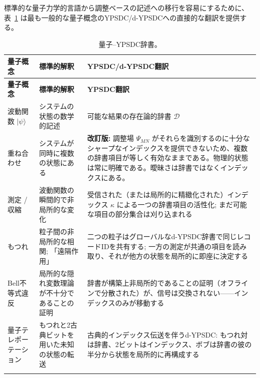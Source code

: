 \documentclass[12pt,a4paper]{article}
\theoremstyle{definition}
\theoremstyle{remark}
\begin{document}
	標準的な量子力学的言語から調整ベースの記述への移行を容易にするために、表~\ref{tab:quantum-dict} は最も一般的な量子概念のYPSDC/d-YPSDCへの直接的な翻訳を提供する。
	
	\begin{longtable}{p{3.5cm} p{5cm} p{7cm}}
		\caption{量子–YPSDC辞書。}\label{tab:quantum-dict}\\
		\toprule
		\textbf{量子概念} & \textbf{標準的解釈} & \textbf{YPSDC/d-YPSDC翻訳} \\
		\midrule
		\endfirsthead
		
		\toprule
		\textbf{量子概念} & \textbf{標準的解釈} & \textbf{YPSDC翻訳} \\
		\midrule
		\endhead
		
		\hline
		\endfoot
		
		\bottomrule
		\endlastfoot
		
		波動関数 \(|\psi\rangle\) &
		システムの状態の数学的記述 &
		可能な結果の存在論的辞書 \(\mathcal{D}\) \\
		\addlinespace
		
		重ね合わせ &
		システムが同時に複数の状態にある &
		\textbf{改訂版:} 調整場 \(\Psi_{MN}\) がそれらを識別するのに十分なシャープなインデックスを提供できないため、複数の辞書項目が等しく有効なままである。物理的状態は常に明確である。曖昧さは辞書ではなくインデックスにある。 \\
		\addlinespace
		
		測定 / 収縮 &
		波動関数の瞬間的で非局所的な変化 &
		受信された（または局所的に精緻化された）インデックス \(\kappa\) による一つの辞書項目の活性化; まだ可能な項目の部分集合は刈り込まれる \\
		\addlinespace
		
		もつれ &
		粒子間の非局所的な相関; 「遠隔作用」 &
		二つの粒子はグローバルなd-YPSDC辞書で同じレコードIDを共有する; 一方の測定が共通の項目を読み取り、それが他方の状態を局所的に即座に決定する \\
		\addlinespace
		
		Bell不等式違反 &
		局所的な隠れ変数理論が不十分であることの証明 &
		辞書が構築上非局所的であることの証明（オフラインで分散された）が、信号は交換されない——インデックスのみが移動する \\
		\addlinespace
		
		量子テレポーテーション &
		もつれと2古典ビットを用いた未知の状態の転送 &
		古典的インデックス伝送を伴うd-YPSDC: もつれ対は辞書、2ビットはインデックス、ボブは辞書の彼の半分から状態を局所的に再構成する \\
		\addlinespace
		

\end{longtable}
\end{document}
